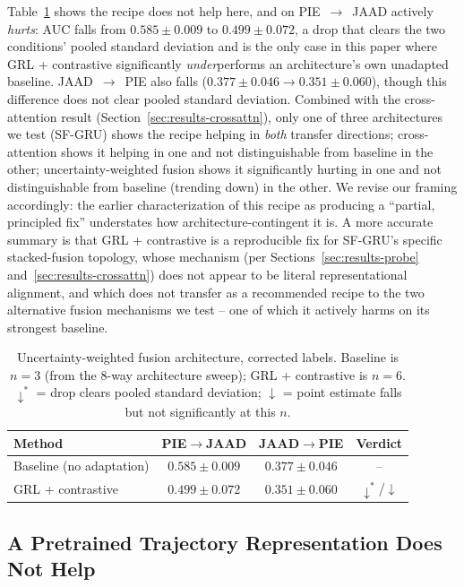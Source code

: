 Table~\ref{tab:uncertainty} shows the recipe does not help here, and on
PIE~$\to$~JAAD actively \emph{hurts}: AUC falls from $0.585\pm0.009$ to
$0.499\pm0.072$, a drop that clears the two conditions' pooled standard
deviation and is the only case in this paper where GRL + contrastive
significantly \emph{under}performs an architecture's own unadapted
baseline. JAAD~$\to$~PIE also falls ($0.377\pm0.046 \to
0.351\pm0.060$), though this difference does not clear pooled standard
deviation. Combined with the cross-attention result
(Section~\ref{sec:results-crossattn}), only one of three architectures
we test (SF-GRU) shows the recipe helping in \emph{both} transfer
directions; cross-attention shows it helping in one and not
distinguishable from baseline in the other; uncertainty-weighted fusion
shows it significantly hurting in one and not distinguishable from
baseline (trending down) in the other. We revise our framing
accordingly: the earlier characterization of this recipe as producing
a ``partial, principled fix'' understates how architecture-contingent
it is. A more accurate summary is that GRL + contrastive is a
reproducible fix for SF-GRU's specific stacked-fusion topology, whose
mechanism (per Sections~\ref{sec:results-probe}
and~\ref{sec:results-crossattn}) does not appear to be literal
representational alignment, and which does not transfer as a
recommended recipe to the two alternative fusion mechanisms we
test -- one of which it actively harms on its strongest baseline.

\begin{table}[t]
\centering
\caption{Uncertainty-weighted fusion architecture, corrected labels.
Baseline is $n=3$ (from the 8-way architecture sweep); GRL + contrastive
is $n=6$. $\downarrow^{*}$ = drop clears pooled standard deviation;
$\downarrow$ = point estimate falls but not significantly at this $n$.}
\label{tab:uncertainty}
\begin{tabular}{lccc}
\toprule
Method & PIE$\to$JAAD & JAAD$\to$PIE & Verdict \\
\midrule
Baseline (no adaptation) & $0.585\pm0.009$ & $0.377\pm0.046$ & -- \\
GRL + contrastive & $0.499\pm0.072$ & $0.351\pm0.060$ & $\downarrow^{*}$/$\downarrow$ \\
\bottomrule
\end{tabular}
\end{table}

\subsection{A Pretrained Trajectory Representation Does Not Help}
\label{sec:results-pretrained-traj}

